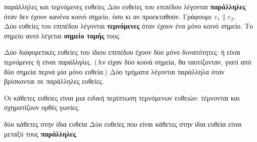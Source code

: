 \begin{orismos}{παράλληλες και τεμνόμενες ευθείες}
Δύο ευθείες του επιπέδου λέγονται \textbf{παράλληλες} όταν δεν έχουν κανένα κοινό σημείο, όσο κι αν προεκταθούν. Γράφουμε $\varepsilon_1\parallel\varepsilon_2$.\\
Δύο ευθείες του επιπέδου λέγονται \textbf{τεμνόμενες} όταν έχουν ένα μόνο κοινό σημείο. Το σημείο αυτό λέγεται \textbf{σημείο τομής} τους.
\end{orismos}

\begin{center}
\end{center}

Δύο διαφορετικές ευθείες του ίδιου επιπέδου έχουν δύο μόνο δυνατότητες: ή είναι \emph{τεμνόμενες} ή είναι \emph{παράλληλες}. (Αν είχαν δύο κοινά σημεία, θα ταυτίζονταν, γιατί από δύο σημεία περνά μία μόνο ευθεία.) Δύο τμήματα λέγονται παράλληλα όταν βρίσκονται σε παράλληλες ευθείες.

Οι κάθετες ευθείες είναι μια ειδική περίπτωση τεμνόμενων ευθειών: τέμνονται και σχηματίζουν ορθές γωνίες.

\begin{kanonas}{δύο κάθετες στην ίδια ευθεία}
Δύο ευθείες που είναι κάθετες στην ίδια ευθεία είναι μεταξύ τους \textbf{παράλληλες}.
\end{kanonas}

\begin{center}
\end{center}

